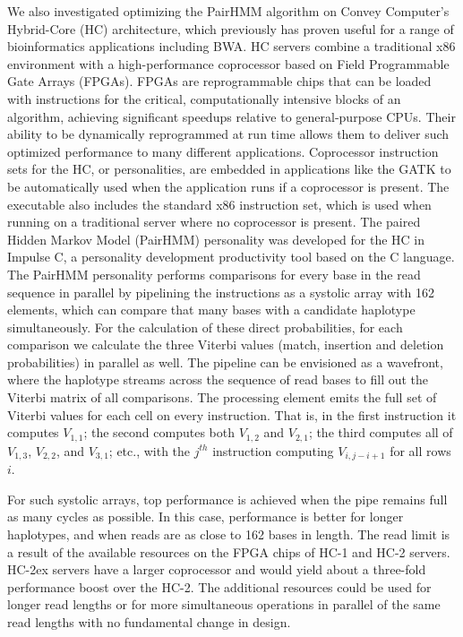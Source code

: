 \documentclass[11pt, oneside]{article}
\begin{document}
	We also investigated optimizing the PairHMM algorithm on Convey Computer’s
	Hybrid-Core (HC) architecture, which previously has proven useful for a
	range of bioinformatics applications including BWA. HC servers combine a
	traditional x86 environment with a high-performance coprocessor based on
	Field Programmable Gate Arrays (FPGAs).  FPGAs are reprogrammable chips that
	can be loaded with instructions for the critical, computationally intensive
	blocks of an algorithm, achieving significant speedups relative to
	general-purpose CPUs. Their ability to be dynamically reprogrammed at run
	time allows them to deliver such optimized performance to many different
	applications.   Coprocessor instruction sets for the HC, or personalities,
	are embedded in applications like the GATK to be automatically used when the
	application runs if a coprocessor is present.  The executable also includes
	the standard x86 instruction set, which is used when running on a
	traditional server where no coprocessor is present.  The paired Hidden
	Markov Model (PairHMM) personality was developed for the HC in Impulse C,
	a personality development productivity tool based on the C language.  The
	PairHMM personality performs comparisons for every base in the read sequence
	in parallel by pipelining the instructions as a systolic array with 162
	elements, which can compare that many bases with a candidate haplotype
	simultaneously.  For the calculation of these direct probabilities, for each
	comparison we calculate the three Viterbi values
	(match, insertion and deletion probabilities) in parallel as well.  The pipeline can be
	envisioned as a wavefront, where the haplotype streams across the sequence
	of read bases to fill out the Viterbi matrix of all comparisons.  The
	processing element emits the full set of Viterbi values for each cell on
	every instruction.  That is, in the first instruction it computes $V_{1,1}$; the
	second computes both $V_{1,2}$ and $V_{2,1}$; the third computes all of $V_{1,3}$, $V_{2,2}$,
	and $V_{3,1}$; etc., with the $j^{th}$ instruction computing $V_{i,j−i+1}$
	for all rows $i$.
	
	For such systolic arrays, top performance is achieved when the pipe remains
	full as many cycles as possible.  In this case, performance is better for
	longer haplotypes, and when reads are as close to 162 bases in length.  The
	read limit is a result of the available resources on the FPGA chips of HC-1
	and HC-2 servers.  HC-2ex servers have a larger coprocessor and would yield
	about a three-fold performance boost over the HC-2.  The additional
	resources could be used for longer read lengths or for more simultaneous
	operations in parallel of the same read lengths with no fundamental change
	in design.  
\end{document}
